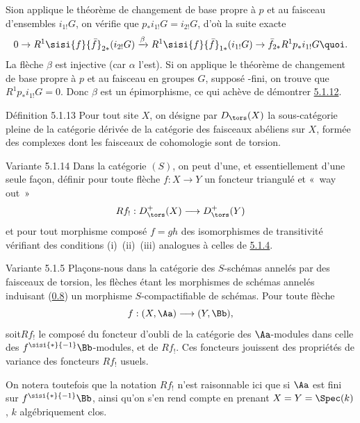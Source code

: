 \documentclass[10pt]{../fichiers-configuration-latex/smfart}
\begin{document}
Si\pageoriginale on applique le théorème de changement de base propre
à $p$ et au faisceau d'ensembles $i_{1!}G$, on vérifie que
$p_{\ast}i_{1!}G=i_{2!}G$, d'où la suite exacte
\[
0\rightarrow R^{1}
\sisi{f}{\bar{f}}_{2\ast}(i_{2!}G)\xrightarrow{\beta}R^{1}\sisi{f}{\bar{f}}_{1\ast}(i_{1!}G)\rightarrow
\bar{f}_{2\ast}R^{1}p_{\ast}i_{1!}G{\quoi}.
\]
La flèche $\beta$ est injective (car $\alpha$ l'est). Si on applique
le théorème de changement de base propre à $p$ et au faisceau en
groupes $G$, supposé \iInd-fini, on trouve que
$R^{1}p_{\ast}i_{1!}G=0$. Donc $\beta$ est un épimorphisme, ce qui
achève de démontrer \hyperref[XVII.var5.1.12]{5.1.12}.

\begin{enonce*}{Définition 5.1.13}
Pour tout site $X$, on désigne par $D_{\tors}(X)$ la sous-catégorie
pleine de la catégorie dérivée de la catégorie des faisceaux abéliens
sur $X$, formée des complexes dont les faisceaux de cohomologie sont
de torsion.
\end{enonce*}

\begin{enonce*}{Variante 5.1.14}
Dans la catégorie $(S)$, on peut d'une, et essentiellement d'une seule
façon, définir pour toute flèche $f:X\rightarrow Y$ un foncteur
triangulé et « way out »  \emph{\cite[I 7]{SGA4-17:RD}}
\[
Rf_{!}:D^{+}_{\tors}(X)\longrightarrow D^{+}_{\tors}(Y)
\]
et pour tout morphisme composé $f=gh$ des isomorphismes de
transitivité vérifiant des conditions \mbox{\rm (i) (ii) (iii)}
analogues à celles de \hyperref[XVII.subsubsec5.1.4]{5.1.4}.
\end{enonce*}

\begin{enonce*}{Variante 5.1.5}
Plaçons-nous dans la catégorie des $S$-schémas annelés par des
faisceaux de torsion, les flèches étant les morphismes de schémas
annelés induisant (\hyperref[XVII.subsec0.8]{0.8}) un morphisme $S$-compactifiable de
schémas. Pour toute flèche
\[
f:(X,\Aa)\longrightarrow (Y,\Bb),
\]
soit\pageoriginale $Rf_{!}$ le composé du foncteur d'oubli de la catégorie des
$\Aa$-modules dans celle des $f^{\sisi{\ast}{-1}}\Bb$-modules, et
de $Rf_{!}$. Ces foncteurs jouissent des propriétés de variance des
foncteurs $Rf_{!}$ usuels.
\end{enonce*}

On notera toutefois que la notation $Rf_{!}$ n'est raisonnable ici que
si $\Aa$ est fini sur $f^{\sisi{\ast}{-1}}\Bb$, ainsi qu'on s'en
rend compte en prenant $X=Y=\Spec(k)$, $k$ algébriquement clos.
\end{document}
